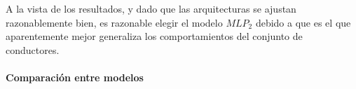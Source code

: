 A la vista de los resultados, y dado que las arquitecturas se ajustan razonablemente bien, es razonable elegir el modelo $MLP_2$ debido a que es el que aparentemente mejor generaliza los comportamientos del conjunto de conductores.

\paragraph{Comparación entre modelos}

